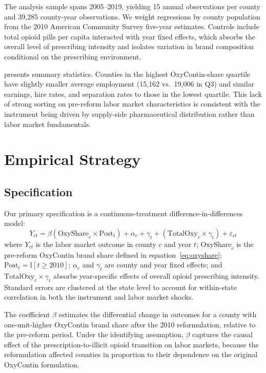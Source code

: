 \documentclass[12pt]{article}
\newcommand{\ind}{\mathbb{I}}
\begin{document}
The analysis sample spans 2005--2019, yielding 15 annual observations per county and 39,285 county-year observations. We weight regressions by county population from the 2010 American Community Survey five-year estimates. Controls include total opioid pills per capita interacted with year fixed effects, which absorbs the overall level of prescribing intensity and isolates variation in brand composition conditional on the prescribing environment.

 presents summary statistics. Counties in the highest OxyContin-share quartile have slightly smaller average employment (15,162 vs.\ 19,006 in Q3) and similar earnings, hire rates, and separation rates to those in the lowest quartile. This lack of strong sorting on pre-reform labor market characteristics is consistent with the instrument being driven by supply-side pharmaceutical distribution rather than labor market fundamentals.




\section{Empirical Strategy}
\label{sec:strategy}

\subsection{Specification}

Our primary specification is a continuous-treatment difference-in-differences model:
\begin{equation}
Y_{ct} = \beta \left(\text{OxyShare}_c \times \text{Post}_t\right) + \alpha_c + \gamma_t + \left(\text{TotalOxy}_c \times \gamma_t\right) + \varepsilon_{ct}
\label{eq:did}
\end{equation}
where $Y_{ct}$ is the labor market outcome in county $c$ and year $t$; $\text{OxyShare}_c$ is the pre-reform OxyContin brand share defined in equation~\eqref{eq:oxyshare}; $\text{Post}_t = \ind[t \geq 2010]$; $\alpha_c$ and $\gamma_t$ are county and year fixed effects; and $\text{TotalOxy}_c \times \gamma_t$ absorbs year-specific effects of overall opioid prescribing intensity. Standard errors are clustered at the state level to account for within-state correlation in both the instrument and labor market shocks.

The coefficient $\beta$ estimates the differential change in outcomes for a county with one-unit-higher OxyContin brand share after the 2010 reformulation, relative to the pre-reform period. Under the identifying assumption, $\beta$ captures the causal effect of the prescription-to-illicit opioid transition on labor markets, because the reformulation affected counties in proportion to their dependence on the original OxyContin formulation.
\end{document}
